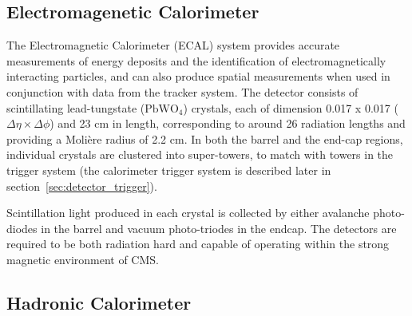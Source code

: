 \subsection{Electromagenetic Calorimeter}



The Electromagnetic Calorimeter (ECAL) system provides accurate measurements of 
energy deposits and the identification of electromagnetically interacting 
particles, and can also produce spatial measurements when used in conjunction 
with data from the tracker system. The detector consists of scintillating
lead-tungstate
($\text{PbWO}_4$) crystals, each of dimension 0.017 x 0.017 ($\Delta \eta \times
\Delta \phi$) and 23 cm in length, corresponding to around 26 radiation lengths
and providing a Moli\`{e}re radius of 2.2 cm. In both the barrel and the
end-cap regions, individual crystals are clustered into super-towers, to match
with towers in the trigger system (the calorimeter trigger system is described
later in section~\ref{sec:detector_trigger}).

Scintillation light produced in each crystal is collected by either
avalanche photo-diodes in the barrel and vacuum photo-triodes in the
endcap. The detectors are required to be both radiation hard and capable of
operating within the strong magnetic environment of CMS.


\subsection{Hadronic Calorimeter}


